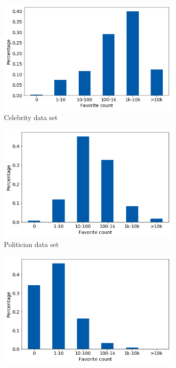 \begin{figure}[h]
\centering
\begin{subfigure}{.45\textwidth}
  \centering
  \includegraphics[width=.95\linewidth]{img/celeb_fav_distr}
  \caption{Celebrity data set}
  \label{fig:fav_distr_sub1}
\end{subfigure}%
\begin{subfigure}{.45\textwidth}
  \centering
  \includegraphics[width=.95\linewidth]{img/polit_fav_distr}
  \caption{Politician data set}
  \label{fig:fav_distr_sub2}
\end{subfigure}
\begin{subfigure}{.45\textwidth}
  \centering
  \includegraphics[width=.95\linewidth]{img/corp_fav_distr}

\end{subfigure}
\end{figure}
